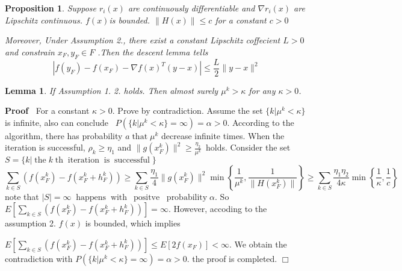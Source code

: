 \documentclass{article}
\newcommand{\nobracket}{}
\newcommand{\tmop}[1]{\ensuremath{\operatorname{#1}}}
\newenvironment{proof}{\noindent\textbf{Proof\ }}{\hspace*{\fill}$\Box$\medskip}
\newtheorem{lemma}{Lemma}
\newtheorem{proposition}{Proposition}
\begin{document}
{{\begin{proposition}
  Suppose $r_i (x)$ are continuously differentiable and $\nabla r_i (x)$ are
  Lipschitz continuous. $f (x) $is bounded. $\| H (x) \| \leqslant c$ for a
  constant $c > 0$
  
  \quad Moreover, Under Assumption 2., there exist a constant Lipschitz
  coffecient $L > 0$ and constrain $x_F, y_F \in F$  .Then the descent lemma
  tells
  \begin{equation}
    | f (y_F) - f (x_F) - \nabla f (x)^T  (y - x) | \leqslant \frac{L}{2} \| y
    - x \|^2
  \end{equation}
\end{proposition}

\begin{lemma}
  If Assumption 1. 2. holds. Then almost surely $\mu^k > \kappa$ for any
  $\kappa > 0$.
\end{lemma}

\begin{proof}
  For a constant $\kappa > 0$. Prove by contradiction. Assume the set $\{ k |
  \nobracket \mu^k < \kappa \}$ is infinite, also can conclude \ $P (\{ k |
  \nobracket \mu^k < \kappa \} = \infty) = \alpha > 0$. According to the
  algorithm, there has probability $a \tmop{that} \mu^k$ decrease infinite
  times. When the iteration is successful, $\rho_k \geqslant \eta_1$ and $\| g
  (x_F^k) \|^2 \geqslant \frac{\eta_2}{\mu^k}$ \,holds. Consider the
  set{\hspace{1.0em}}$S = \{ k | \tmop{the} k \tmop{th} \tmop{iteration}
  \tmop{is} \tmop{successful} \nobracket \}$
  \begin{equation}
    \sum_{k \in S} (f (x^k_F) - f (x^k_F + h_F^k)) \geqslant \sum_{k \in S}
    \frac{\eta_1}{4}  \| g (x_F^k) \|^2 \min \left\{ \frac{1}{\mu^k},
    \frac{1}{\| H (x_F^k) \|} \right\} \geqslant \sum_{k \in S}  \frac{\eta_1
    \eta_2}{4 \kappa} \min \left\{ \frac{1}{\kappa}, \frac{1}{c} \right\}
  \end{equation}
  note that $| S | = \infty \; \tmop{happens} \tmop{with} \: \tmop{positve} \;
  \tmop{probability} \alpha$. So $E \left[ \sum_{k \in S} (f (x^k_F) - f
  (x^k_F + h_F^k)) \right] = \infty$. However, accoding to the assumption 2.
  $f (x)$ is bounded, which implies
  
  $E \left[ \sum_{k \in S} (f (x^k_F) - f (x^k_F + h_F^k)) \right] \leqslant
  E [2 f (x_F)] < \infty$. We obtain the contradiction with $P (\{ k |
  \nobracket \mu^k < \kappa \} = \infty) = \alpha > 0$. the proof is
  completed.
\end{proof}

}}
\end{document}
